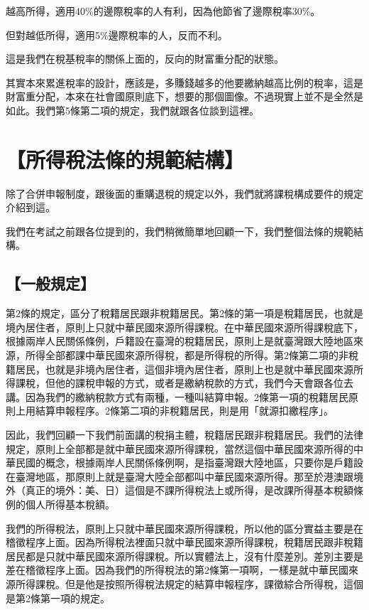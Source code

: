 \documentclass[oneside,sub3section]{ctexbook}
\begin{document}
越高所得，適用40\%的邊際稅率的人有利，因為他節省了邊際稅率30\%。

但對越低所得，適用5\%邊際稅率的人，反而不利。

這是我們在稅基稅率的關係上面的，反向的財富重分配的狀態。

其實本來累進稅率的設計，應該是，多賺錢越多的他要繳納越高比例的稅率，這是財富重分配，本來在社會國原則底下，想要的那個圖像。不過現實上並不是全然是如此。我們第5條第二項的規定，我們就跟各位談到這裡。

\hypertarget{ux6240ux5f97ux7a05ux6cd5ux689dux7684ux898fux7bc4ux7d50ux69cb}{%
\section{【所得稅法條的規範結構】}\label{ux6240ux5f97ux7a05ux6cd5ux689dux7684ux898fux7bc4ux7d50ux69cb}}

除了合併申報制度，跟後面的重購退稅的規定以外，我們就將課稅構成要件的規定介紹到這。

我們在考試之前跟各位提到的，我們稍微簡單地回顧一下，我們整個法條的規範結構。

\hypertarget{ux4e00ux822cux898fux5b9a}{%
\subsection{【一般規定】}\label{ux4e00ux822cux898fux5b9a}}

第2條的規定，區分了稅籍居民跟非稅籍居民。第2條的第一項是稅籍居民，也就是境內居住者，原則上只就中華民國來源所得課稅。在中華民國來源所得課稅底下，根據兩岸人民關係條例，戶籍設在臺灣的稅籍居民，原則上是就臺灣跟大陸地區來源，所得全部都課中華民國來源所得稅，都是所得稅的所得。第2條第二項的非稅籍居民，也就是非境內居住者，這個非境內居住者，原則上也是就中華民國來源所得課稅，但他的課稅申報的方式，或者是繳納稅款的方式，我們今天會跟各位去講。因為我們的繳納稅款方式有兩種，一種叫結算申報。2條第一項的稅籍居民原則上用結算申報程序。2條第二項的非稅籍居民，則是用「就源扣繳程序」。

因此，我們回顧一下我們前面講的稅捐主體，稅籍居民跟非稅籍居民。我們的法律規定，原則上全部都是就中華民國來源所得課稅，當然這個中華民國來源所得的中華民國的概念，根據兩岸人民關係條例啊，是指臺灣跟大陸地區，只要你是戶籍設在臺灣地區，那原則上就是臺灣大陸全部都叫中華民國來源所得。那至於港澳跟境外（真正的境外：美、日）這個是不課所得稅法上或所得，是改課所得基本稅額條例的個人所得基本稅額。

我們的所得稅法，原則上只就中華民國來源所得課稅，所以他的區分實益主要是在稽徵程序上面。因為所得稅法裡面只就中華民國來源所得課稅，稅籍居民跟非稅籍居民都是只就中華民國來源所得課稅。所以實體法上，沒有什麼差別。差別主要是差在稽徵程序上面。因為我們的所得稅法的第2條第一項啊，一樣是就中華民國來源所得課稅。但是他是按照所得稅法規定的結算申報程序，課徵綜合所得稅，這個是第2條第一項的規定。
\end{document}

